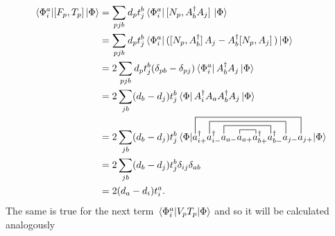 \documentclass[10pt]{article}
\begin{document}
\begin{align}
\mel*{\Phi_i^a}{\comm*{F_p}{T_p}}{\Phi}
&=
\sum_{pjb}d_pt_j^b\bra*{\Phi_i^a}\comm*{N_p}{A^\dagger_bA_j}\ket{\Phi}
\nonumber
\\
&=
\sum_{pjb}d_pt_j^b\bra*{\Phi_i^a}(\comm*{N_p}{A^\dagger_b}A_j-A^\dagger_b\comm*{N_p}{A_j})\ket{\Phi}
\nonumber
\\
&=
2\sum_{pjb}d_pt_j^b(\delta_{pb}-\delta_{pj})\bra*{\Phi_i^a}A^\dagger_bA_j\ket{\Phi}
\nonumber
\\
&=
2\sum_{jb}(d_b-d_j)t_j^b\bra*{\Phi}A^\dagger_iA_aA^\dagger_bA_j\ket{\Phi}
\nonumber
\\
&=
2\sum_{jb}(d_b-d_j)t_j^b
\mel*{\Phi}{
\contraction[1ex]{a^\dagger_{i+}a^\dagger_{i-}a_{a-}}{a}{_{a+}}
{a}
\contraction[2ex]{a^\dagger_{i+}a^\dagger_{i-}}{a}{_{a-}a_{a+}
a^\dagger_{b+}}{a}
\contraction[3ex]{a^\dagger_{i+}}{a}{^\dagger_{i-}a_{a-}a_{a+}
a^\dagger_{b+}a^\dagger_{b-}}{a}
\contraction[4ex]{}{a}{^\dagger_{i+}a^\dagger_{i-}a_{a-}a_{a+}
a^\dagger_{b+}a^\dagger_{b-}a_{j-}}{a}
a^\dagger_{i+}a^\dagger_{i-}a_{a-}a_{a+}a^\dagger_{b+}a^\dagger_{b-}a_{j-}a_{j+}
}{\Phi}
\nonumber
\\
&=
2\sum_{jb}(d_b-d_j)t_j^b\delta_{ij}\delta_{ab}
\nonumber
\\
&=
2(d_a-d_i)t_i^a
.\end{align}
The same is true for the next term $\mel*{\Phi^a_i}{V_pT_p}{\Phi}$ and so it will be calculated analogously
\end{document}
